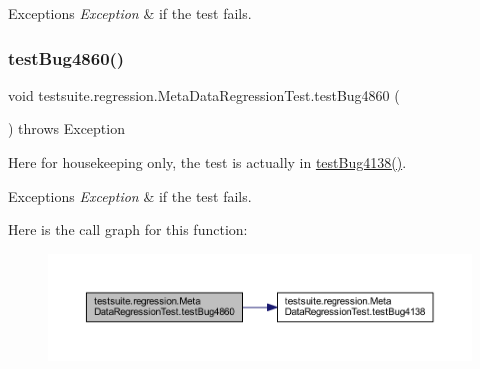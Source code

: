 \begin{DoxyExceptions}{Exceptions}
{\em Exception} & if the test fails. \\
\hline
\end{DoxyExceptions}
\mbox{\label{classtestsuite_1_1regression_1_1_meta_data_regression_test_a9c33a8fd6a670158feb2efa4cbf966ad}} 
\subsubsection{\texorpdfstring{test\+Bug4860()}{testBug4860()}}
{\footnotesize\ttfamily void testsuite.\+regression.\+Meta\+Data\+Regression\+Test.\+test\+Bug4860 (\begin{DoxyParamCaption}{ }\end{DoxyParamCaption}) throws Exception}

Here for housekeeping only, the test is actually in \mbox{\hyperlink{classtestsuite_1_1regression_1_1_meta_data_regression_test_a5c0ea954c7204a811055ea0487e75862}{test\+Bug4138()}}.


\begin{DoxyExceptions}{Exceptions}
{\em Exception} & if the test fails. \\
\hline
\end{DoxyExceptions}
Here is the call graph for this function\+:
\nopagebreak
\begin{figure}[H]
\begin{center}
\leavevmode
\includegraphics[width=350pt]{classtestsuite_1_1regression_1_1_meta_data_regression_test_a9c33a8fd6a670158feb2efa4cbf966ad_cgraph}
\end{center}
\end{figure}
\mbox{\label{classtestsuite_1_1regression_1_1_meta_data_regression_test_a5f79cbc323ee6b50a304811b962f4b37}} 
